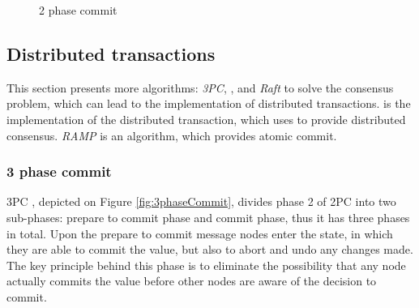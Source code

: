 \begin{figure}[h]
	\centering
	\caption{2 phase commit}
	\label{fig:2phaseCommit}
\end{figure}


\subsection{Distributed transactions}


This section presents more algorithms: \emph{3PC}, \paxos, and \emph{Raft} to solve the consensus problem, which can lead to the implementation of distributed transactions. \lwt is the implementation of the distributed transaction, which uses \paxos to provide distributed consensus. \emph{RAMP} is an algorithm, which provides atomic commit.


\subsubsection{3 phase commit}\label{sec:theory:transactions:3pc}
3PC \cite{3phaseC}, depicted on Figure \ref{fig:3phaseCommit}, divides phase 2 of 2PC into two sub-phases: prepare to commit phase and commit phase, thus it has three phases in total. Upon the prepare to commit message nodes enter the state, in which they are able to commit the value, but also to abort and undo any changes made. The key principle behind this phase is to eliminate the possibility that any node actually commits the value before other nodes are aware of the decision to commit.

